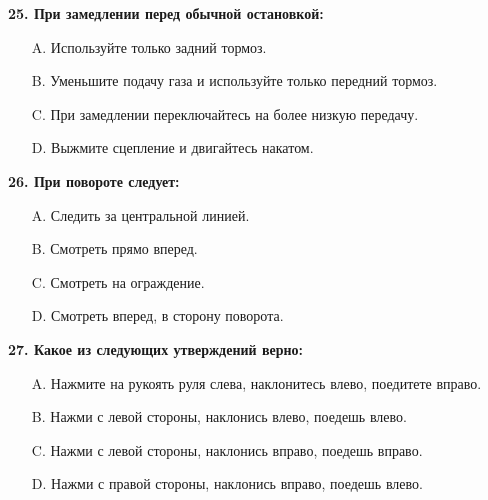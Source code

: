 \begin{minipage}{\linewidth}
\vspace{1em}\noindent\textbf{25. При замедлении перед обычной остановкой:}

\begin{itemize}[nosep,leftmargin=2em]
\item [A.] Используйте только задний тормоз.
\item [B.] Уменьшите подачу газа и используйте только передний тормоз.
\item [C.] При замедлении переключайтесь на более низкую передачу.
\item [D.] Выжмите сцепление и двигайтесь накатом.

\end{itemize}
\end{minipage}


\begin{minipage}{\linewidth}
\vspace{1em}\noindent\textbf{26. При повороте следует:}

\begin{itemize}[nosep,leftmargin=2em]
\item [A.] Следить за центральной линией.
\item [B.] Смотреть прямо вперед.
\item [C.] Смотреть на ограждение.
\item [D.] Смотреть вперед, в сторону поворота.

\end{itemize}
\end{minipage}


\begin{minipage}{\linewidth}
\vspace{1em}\noindent\textbf{27. Какое из следующих утверждений верно:}

\begin{itemize}[nosep,leftmargin=2em]
\item [A.] Нажмите на рукоять руля слева, наклонитесь влево, поедитете вправо.
\item [B.] Нажми с левой стороны, наклонись влево, поедешь влево.
\item [C.] Нажми с левой стороны, наклонись вправо, поедешь вправо.
\item [D.] Нажми с правой стороны, наклонись вправо, поедешь влево.

\end{itemize}
\end{minipage}


